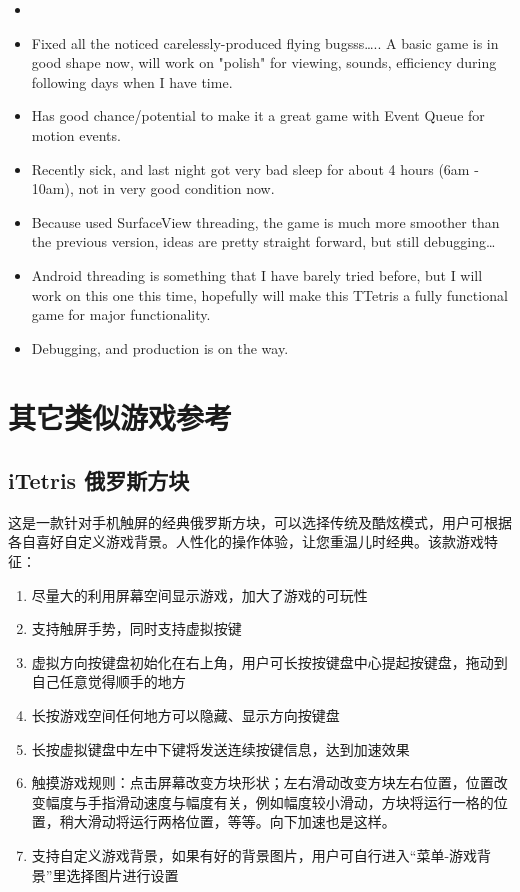 \documentclass[9pt,b5paper]{article}
\begin{document}
\begin{itemize}
\item 
\item Fixed all the noticed carelessly-produced flying bugsss\ldots{}.. A basic game is in good shape now, will work on "polish" for viewing, sounds, efficiency during following days when I have time.
\item Has good chance/potential to make it a great game with Event Queue for motion events.
\item Recently sick, and last night got very bad sleep for about 4 hours (6am - 10am), not in very good condition now.
\item Because used SurfaceView threading, the game is much more smoother than the previous version, ideas are pretty straight forward, but still debugging\ldots{}
\item Android threading is something that I have barely tried before, but I will work on this one this time, hopefully will make this TTetris a fully functional game for major functionality.
\item Debugging, and production is on the way.
\end{itemize}

\section{其它类似游戏参考}
\label{sec-2}
\subsection{iTetris 俄罗斯方块}
\label{sec-2-1}
这是一款针对手机触屏的经典俄罗斯方块，可以选择传统及酷炫模式，用户可根据各自喜好自定义游戏背景。人性化的操作体验，让您重温儿时经典。该款游戏特征：

\begin{enumerate}
\item 尽量大的利用屏幕空间显示游戏，加大了游戏的可玩性
\item 支持触屏手势，同时支持虚拟按键
\item 虚拟方向按键盘初始化在右上角，用户可长按按键盘中心提起按键盘，拖动到自己任意觉得顺手的地方
\item 长按游戏空间任何地方可以隐藏、显示方向按键盘
\item 长按虚拟键盘中左中下键将发送连续按键信息，达到加速效果
\item 触摸游戏规则：点击屏幕改变方块形状；左右滑动改变方块左右位置，位置改变幅度与手指滑动速度与幅度有关，例如幅度较小滑动，方块将运行一格的位置，稍大滑动将运行两格位置，等等。向下加速也是这样。
\item 支持自定义游戏背景，如果有好的背景图片，用户可自行进入“菜单-游戏背景”里选择图片进行设置
\end{enumerate}
\end{document}
